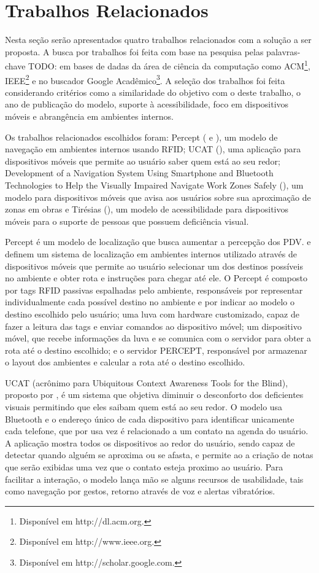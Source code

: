 \documentclass[twoside,english,brazilian]{UNISINOSartigo}
\begin{document}
\section{Trabalhos Relacionados}
Nesta seção serão apresentados quatro trabalhos relacionados com a solução a ser proposta. A busca por trabalhos foi feita com base na pesquisa pelas palavras-chave TODO: em bases de dadas da área de ciência da computação como ACM\footnote{Disponível em http://dl.acm.org.}, IEEE\footnote{Disponível em http://www.ieee.org.} e no buscador Google Acadêmico\footnote{Disponível em http://scholar.google.com.}. A seleção dos trabalhos foi feita considerando critérios como a similaridade do objetivo com o deste trabalho, o ano de publicação do modelo, suporte à acessibilidade, foco em dispositivos móveis e abrangência em ambientes internos.

Os trabalhos relacionados escolhidos foram: Percept (\cite{Ganz2011} e \cite{Ganz2012}), um modelo de navegação em ambientes internos usando RFID; 
UCAT (), uma aplicação para dispositivos móveis que permite ao usuário saber quem está ao seu redor; 
Development of a Navigation System Using Smartphone and Bluetooth Technologies to Help the Visually Impaired Navigate Work Zones Safely (), um modelo para dispositivos móveis que avisa aos usuários sobre sua aproximação de zonas em obras e Tirésias (), um modelo de acessibilidade para dispositivos móveis para o suporte de pessoas que possuem deficiência visual.

Percept é um modelo de localização que busca aumentar a percepção dos PDV.  e  definem um sistema de localização em ambientes internos utilizado através de dispositivos móveis que permite ao usuário selecionar um dos destinos possíveis no ambiente e obter rota e instruções para chegar até ele. O Percept é composto por tags RFID passivas espalhadas pelo ambiente, responsáveis por representar individualmente cada possível destino no ambiente e por indicar ao modelo o destino escolhido pelo usuário; uma luva com hardware customizado, capaz de fazer a leitura das tags e enviar comandos ao dispositivo móvel; um dispositivo móvel, que recebe informações da luva e se comunica com o servidor para obter a rota até o destino escolhido; e o servidor PERCEPT, responsável por armazenar o layout dos ambientes e calcular a rota até o destino escolhido.

UCAT (acrônimo para Ubiquitous Context Awareness Tools for the Blind), proposto por , é um sistema que objetiva diminuir o desconforto dos deficientes visuais permitindo que eles saibam quem está ao seu redor. O modelo usa Bluetooth e o endereço único de cada dispositivo para identificar unicamente cada telefone, que por usa vez é relacionado a um contato na agenda do usuário. A aplicação mostra todos os dispositivos ao redor do usuário, sendo capaz de detectar quando alguém se aproxima ou se afasta, e permite ao a criação de notas que serão exibidas uma vez que o contato esteja proximo ao usuário. Para facilitar a interação, o modelo lança mão se alguns recursos de usabilidade, tais como navegação por gestos, retorno através de voz e alertas vibratórios.
\end{document}
